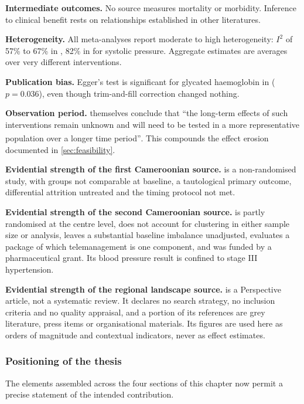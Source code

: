 \documentclass[12pt,a4paper,oneside]{report}
\newcommand{\bq}[1]{``#1''\textsuperscript{\dag}}
\begin{document}
\textbf{Intermediate outcomes.} No source measures mortality or morbidity. Inference to clinical benefit rests on relationships established in other literatures.

\textbf{Heterogeneity.} All meta-analyses report moderate to high heterogeneity: $I^2$ of 57\% to 67\% in \textcite{mao2020}, 82\% in \textcite{zhou2024} for systolic pressure. Aggregate estimates are averages over very different interventions.

\textbf{Publication bias.} Egger's test is significant for glycated haemoglobin in \textcite{mao2020} ($p = 0.036$), even though trim-and-fill correction changed nothing.

\textbf{Observation period.} \Textcite{mao2020} themselves conclude that \bq{the long-term effects of such interventions remain unknown and will need to be tested in a more representative population over a longer time period}. This compounds the effect erosion documented in \cref{sec:feasibility}.

\textbf{Evidential strength of the first Cameroonian source.} \Textcite{bediang2021} is a non-randomised study, with groups not comparable at baseline, a tautological primary outcome, differential attrition untreated and the timing protocol not met.

\textbf{Evidential strength of the second Cameroonian source.} \Textcite{kingue2013} is partly randomised at the centre level, does not account for clustering in either sample size or analysis, leaves a substantial baseline imbalance unadjusted, evaluates a package of which telemanagement is one component, and was funded by a pharmaceutical grant. Its blood pressure result is confined to stage III hypertension.

\textbf{Evidential strength of the regional landscape source.} \Textcite{segun2025} is a Perspective article, not a systematic review. It declares no search strategy, no inclusion criteria and no quality appraisal, and a portion of its references are grey literature, press items or organisational materials. Its figures are used here as orders of magnitude and contextual indicators, never as effect estimates.

\subsubsection{Positioning of the thesis}

The elements assembled across the four sections of this chapter now permit a precise statement of the intended contribution.
\end{document}
